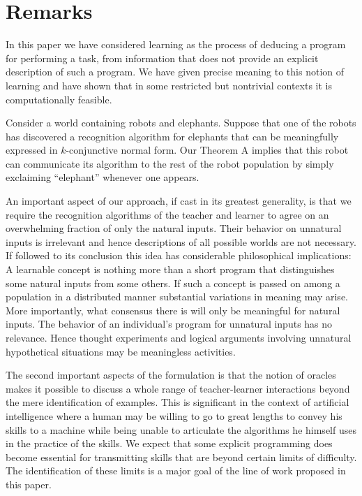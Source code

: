 \section{Remarks}

In this paper we have considered learning as the process of deducing a program for performing a task, from information that does not provide an explicit description of such a program. We have given precise meaning to this notion of learning and have shown that in some restricted but nontrivial contexts it is computationally feasible.

Consider a world containing robots and elephants. Suppose that one of the robots has discovered a recognition algorithm for elephants that can be meaningfully expressed in $k$-conjunctive normal form. Our Theorem A implies that this robot can communicate its algorithm to the rest of the robot population by simply exclaiming ``elephant'' whenever one appears.

An important aspect of our approach, if cast in its greatest generality, is that we require the recognition algorithms of the teacher and learner to agree on an overwhelming fraction of only the natural inputs. Their behavior on unnatural inputs is irrelevant and hence descriptions of all possible worlds are not necessary. If followed to its conclusion this idea has considerable philosophical implications: A learnable concept is nothing more than a short program that distinguishes some natural inputs from some others. If such a concept is passed on among a population in a distributed manner substantial variations in meaning may arise. More importantly, what consensus there is will only be meaningful for natural inputs. The behavior of an individual's program for unnatural inputs has no relevance. Hence thought experiments and logical arguments involving unnatural hypothetical situations may be meaningless activities.

The second important aspects of the formulation is that the notion of oracles makes it possible to discuss a whole range of teacher-learner interactions beyond the mere identification of examples. This is significant in the context of artificial intelligence where a human may be willing to go to great lengths to convey his skills to a machine while being unable to articulate the algorithms he himself uses in the practice of the skills. We expect that some explicit programming does become essential for transmitting skills that are beyond certain limits of difficulty. The identification of these limits is a major goal of the line of work proposed in this paper.
